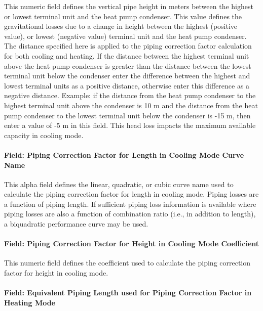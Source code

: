 This numeric field defines the vertical pipe height in meters between the highest or lowest terminal unit and the heat pump condenser. This value defines the gravitational losses due to a change in height between the highest (positive value), or lowest (negative value) terminal unit and the heat pump condenser. The distance specified here is applied to the piping correction factor calculation for both cooling and heating. If the distance between the highest terminal unit above the heat pump condenser is greater than the distance between the lowest terminal unit below the condenser enter the difference between the highest and lowest terminal units as a positive distance, otherwise enter this difference as a negative distance. Example: if the distance from the heat pump condenser to the highest terminal unit above the condenser is 10 m and the distance from the heat pump condenser to the lowest terminal unit below the condenser is -15 m, then enter a value of -5 m in this field. This head loss impacts the maximum available capacity in cooling mode.

\paragraph{Field: Piping Correction Factor for Length in Cooling Mode Curve Name}\label{field-piping-correction-factor-for-length-in-cooling-mode-curve-name}

This alpha field defines the linear, quadratic, or cubic curve name used to calculate the piping correction factor for length in cooling mode. Piping losses are a function of piping length. If sufficient piping loss information is available where piping losses are also a function of combination ratio (i.e., in addition to length), a biquadratic performance curve may be used.

\paragraph{Field: Piping Correction Factor for Height in Cooling Mode Coefficient}\label{field-piping-correction-factor-for-height-in-cooling-mode-coefficient}

This numeric field defines the coefficient used to calculate the piping correction factor for height in cooling mode.

\paragraph{Field: Equivalent Piping Length used for Piping Correction Factor in Heating Mode}\label{field-equivalent-piping-length-used-for-piping-correction-factor-in-heating-mode-000}

